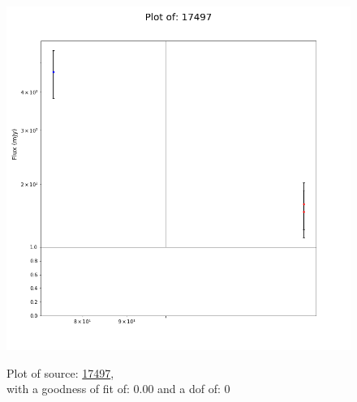 \documentclass{article}
\begin{document}
\begin{figure}[H]
    \centering
    \begin{minipage}{.5\textwidth}
        \centering
        \includegraphics[scale = 0.35]{KmeulenTrap4P23_1min/1min17497.png}
        \captionsetup{labelformat=empty}
        \caption{Plot of source: \href{http://banana.transientskp.org/r4/vlo_KmeulenTrap4P23/runningcatalog/17497}{17497},\\with a goodness of fit of: 0.00 and a dof of: 0}
        \addtocounter{figure}{-1}
        \label{KmeulenTrap4P23:1min:17497:plot}
    \end{minipage}%
    \begin{minipage}{0.5\textwidth}
        \centering


\end{minipage}
\end{figure}
\end{document}
